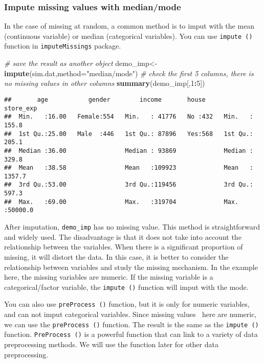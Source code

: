 \documentclass[
]{article}
\newenvironment{Shaded}{\begin{snugshade}}{\end{snugshade}}
\newcommand{\CommentTok}[1]{\textcolor[rgb]{0.56,0.35,0.01}{\textit{#1}}}
\newcommand{\DataTypeTok}[1]{\textcolor[rgb]{0.13,0.29,0.53}{#1}}
\newcommand{\DecValTok}[1]{\textcolor[rgb]{0.00,0.00,0.81}{#1}}
\newcommand{\KeywordTok}[1]{\textcolor[rgb]{0.13,0.29,0.53}{\textbf{#1}}}
\newcommand{\NormalTok}[1]{#1}
\newcommand{\OperatorTok}[1]{\textcolor[rgb]{0.81,0.36,0.00}{\textbf{#1}}}
\newcommand{\StringTok}[1]{\textcolor[rgb]{0.31,0.60,0.02}{#1}}
\begin{document}
\hypertarget{impute-missing-values-with-medianmode}{%
\subsubsection{Impute missing values with
median/mode}\label{impute-missing-values-with-medianmode}}

In the case of missing at random, a common method is to imput with the
mean (continuous variable) or median (categorical variables). You can
use \texttt{impute\ ()} function in \texttt{imputeMissings} package.

\begin{Shaded}
\begin{Highlighting}[]
\CommentTok{# save the result as another object}
\NormalTok{demo_imp<-}\KeywordTok{impute}\NormalTok{(sim.dat,}\DataTypeTok{method=}\StringTok{"median/mode"}\NormalTok{)}
\CommentTok{# check the first 5 columns, there is no missing values in other columns}
\KeywordTok{summary}\NormalTok{(demo_imp[,}\DecValTok{1}\OperatorTok{:}\DecValTok{5}\NormalTok{])}
\end{Highlighting}
\end{Shaded}

\begin{verbatim}
##       age           gender        income       house       store_exp      
##  Min.   :16.00   Female:554   Min.   : 41776   No :432   Min.   :  155.8  
##  1st Qu.:25.00   Male  :446   1st Qu.: 87896   Yes:568   1st Qu.:  205.1  
##  Median :36.00                Median : 93869             Median :  329.8  
##  Mean   :38.58                Mean   :109923             Mean   : 1357.7  
##  3rd Qu.:53.00                3rd Qu.:119456             3rd Qu.:  597.3  
##  Max.   :69.00                Max.   :319704             Max.   :50000.0
\end{verbatim}

After imputation, \texttt{demo\_imp} has no missing value. This method
is straightforward and widely used. The disadvantage is that it does not
take into account the relationship between the variables. When there is
a significant proportion of missing, it will distort the data. In this
case, it is better to consider the relationship between variables and
study the missing mechanism. In the example here, the missing variables
are numeric. If the missing variable is a categorical/factor variable,
the \texttt{impute\ ()} function will imput with the mode.

You can also use \texttt{preProcess\ ()} function, but it is only for
numeric variables, and can not imput categorical variables. Since
missing values here are numeric, we can use the
\texttt{preProcess\ ()} function. The result is the same as the
\texttt{impute\ ()} function. \texttt{PreProcess\ ()} is a powerful
function that can link to a variety of data preprocessing methods. We
will use the function later for other data preprocessing.
\end{document}
